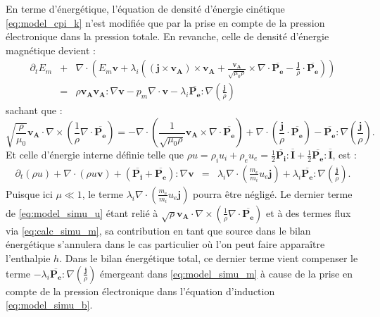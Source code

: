 En terme d'énergétique, l'équation de densité d'énergie cinétique \eqref{eq:model_cpi_k} n'est modifiée que par la prise en compte de la pression électronique dans la pression totale. En revanche, celle de densité d'énergie magnétique devient :
\begin{eqnarray}
  \label{eq:model_simu_m}   \partial_t E_m  &+&\nabla   \cdot  \left(E_m\boldsymbol{v}+ \lambda_i \left(\left(\boldsymbol{j}  \times \boldsymbol{v_A}\right)\times \boldsymbol{v_A}  + \frac{\boldsymbol{v_A}}{\sqrt{\mu_0\rho}}  \times \nabla \cdot \overline{\boldsymbol{P_{e}}} -  \frac{\boldsymbol{j}}{\rho}\cdot \overline{\boldsymbol{P_{e}}}\right) \right) \nonumber\\
  &=& \rho  \boldsymbol{v_A}\boldsymbol{v_A}  : \nabla \boldsymbol{v}- p_m  \nabla \cdot \boldsymbol{v}   - \lambda_i \overline{\boldsymbol{P_{e}}} : \nabla \left(\frac{\boldsymbol{j}}{\rho} \right)
\end{eqnarray}
sachant que :
\begin{equation}
\label{eq:calc_simu_m} 
\sqrt{\frac{\rho}{\mu_0}} \boldsymbol{v_A} \cdot \nabla \times \left(\frac{1}{\rho} \nabla \cdot \overline{\boldsymbol{P_{e}}}\right) = - \nabla \cdot \left(\frac{1}{\sqrt{\mu_0 \rho}} \boldsymbol{v_A} \times \nabla \cdot \overline{\boldsymbol{P_{e}}}  \right) +  \nabla \cdot \left( \frac{ \boldsymbol{j}}{\rho} \cdot \overline{\boldsymbol{P_{e}}}\right) - \overline{\boldsymbol{P_{e}}} : \nabla \left(\frac{\boldsymbol{j}}{\rho} \right) .
\end{equation}
Et celle d'énergie interne définie telle que  $\rho u = \rho_i u_i +  \rho_e u_e = \frac{1}{2} \overline{\boldsymbol{P_{i}}} : \overline{\boldsymbol{I}} +\frac{1}{2} \overline{\boldsymbol{P_{e}}} : \overline{\boldsymbol{I}}$, est : 
\begin{eqnarray}
\label{eq:model_simu_u} \partial_t \left(\rho u\right) + \nabla \cdot \left(  \rho u \boldsymbol{v}\right) + \left(\overline{\boldsymbol{P_i}}+\overline{\boldsymbol{P_{e}}}\right) : \nabla \boldsymbol{v} & =&  \lambda_i \nabla \cdot  \left(\frac{m_e}{m_i} u_e \boldsymbol{j}\right) +  \lambda_i \overline{\boldsymbol{P_{e}}} : \nabla \left(\frac{\boldsymbol{j}}{\rho} \right) .
\end{eqnarray}
 Puisque ici $\mu \ll 1$, le terme $\lambda_i \nabla \cdot  \left(\frac{m_e}{m_i} u_e \boldsymbol{j}\right)$ pourra être négligé. Le dernier terme de \eqref{eq:model_simu_u} étant relié à $\sqrt{\rho} \boldsymbol{v_A} \cdot \nabla \times \left(\frac{1}{\rho} \nabla \cdot \overline{\boldsymbol{P_{e}}}\right) $ et à des termes flux via \eqref{eq:calc_simu_m}, sa contribution en tant que source dans le bilan énergétique s'annulera dans le cas particulier où l'on peut faire apparaître l'enthalpie $h$. Dans le bilan énergétique total, ce dernier terme vient compenser le terme $- \lambda_i \overline{\boldsymbol{P_{e}}} : \nabla \left(\frac{\boldsymbol{j}}{\rho} \right)$ émergeant dans \eqref{eq:model_simu_m} à cause de la prise en compte de la pression électronique dans l'équation d'induction \eqref{eq:model_simu_b}.
 
